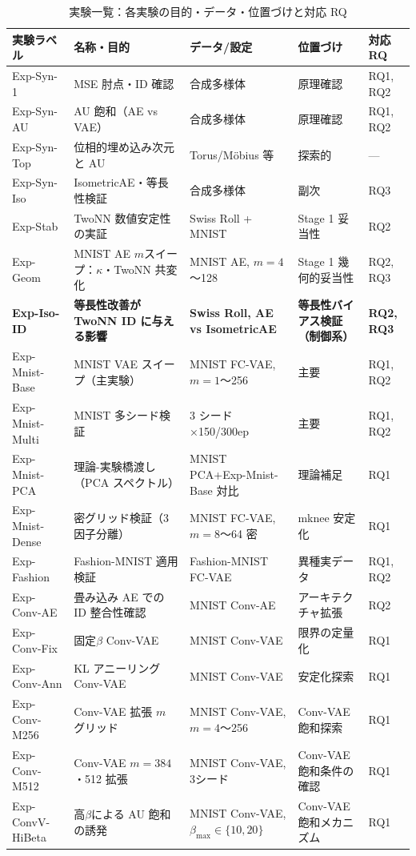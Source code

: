\documentclass[11pt,a4paper]{jsarticle}
\begin{document}
\begin{table}[H]
\centering
\caption{実験一覧：各実験の目的・データ・位置づけと対応 RQ}
\label{tab:exp_list}
\small
\begin{tabular}{lllll}
\toprule
実験ラベル & 名称・目的 & データ/設定 & 位置づけ & 対応 RQ \\
\midrule
Exp-Syn-1 & MSE 肘点・ID 確認 & 合成多様体 & 原理確認 & RQ1, RQ2 \\
Exp-Syn-AU & AU 飽和（AE vs VAE） & 合成多様体 & 原理確認 & RQ1, RQ2 \\
Exp-Syn-Top & 位相的埋め込み次元と AU & Torus/Möbius 等 & 探索的 & --- \\
Exp-Syn-Iso & IsometricAE・等長性検証 & 合成多様体 & 副次 & RQ3 \\
Exp-Stab & TwoNN 数値安定性の実証 & Swiss Roll + MNIST & Stage 1 妥当性 & RQ2 \\
Exp-Geom & MNIST AE $m$スイープ：$\kappa$・TwoNN 共変化 & MNIST AE, $m=4$〜128 & Stage 1 幾何的妥当性 & RQ2, RQ3 \\
\textbf{Exp-Iso-ID} & \textbf{等長性改善が TwoNN ID に与える影響} & \textbf{Swiss Roll, AE vs IsometricAE} & \textbf{等長性バイアス検証（制御系）} & \textbf{RQ2, RQ3} \\
Exp-Mnist-Base & MNIST VAE スイープ（主実験） & MNIST FC-VAE, $m=1$〜256 & 主要 & RQ1, RQ2 \\
Exp-Mnist-Multi & MNIST 多シード検証 & 3 シード×150/300ep & 主要 & RQ1, RQ2 \\
Exp-Mnist-PCA & 理論-実験橋渡し（PCA スペクトル） & MNIST PCA+Exp-Mnist-Base 対比 & 理論補足 & RQ1 \\
Exp-Mnist-Dense & 密グリッド検証（3因子分離） & MNIST FC-VAE, $m=8$〜64 密 & mknee 安定化 & RQ1 \\
Exp-Fashion & Fashion-MNIST 適用検証 & Fashion-MNIST FC-VAE & 異種実データ & RQ1, RQ2 \\
Exp-Conv-AE & 畳み込み AE での ID 整合性確認 & MNIST Conv-AE & アーキテクチャ拡張 & RQ2 \\
Exp-Conv-Fix & 固定$\beta$ Conv-VAE & MNIST Conv-VAE & 限界の定量化 & RQ1 \\
Exp-Conv-Ann & KL アニーリング Conv-VAE & MNIST Conv-VAE & 安定化探索 & RQ1 \\
Exp-Conv-M256 & Conv-VAE 拡張 $m$ グリッド & MNIST Conv-VAE, $m=4$〜256 & Conv-VAE 飽和探索 & RQ1 \\
Exp-Conv-M512 & Conv-VAE $m=384$・512 拡張 & MNIST Conv-VAE, 3シード & Conv-VAE 飽和条件の確認 & RQ1 \\
Exp-ConvV-HiBeta & 高$\beta$による AU 飽和の誘発 & MNIST Conv-VAE, $\beta_{\max}\in\{10,20\}$ & Conv-VAE 飽和メカニズム & RQ1 \\

\end{tabular}
\end{table}
\end{document}
